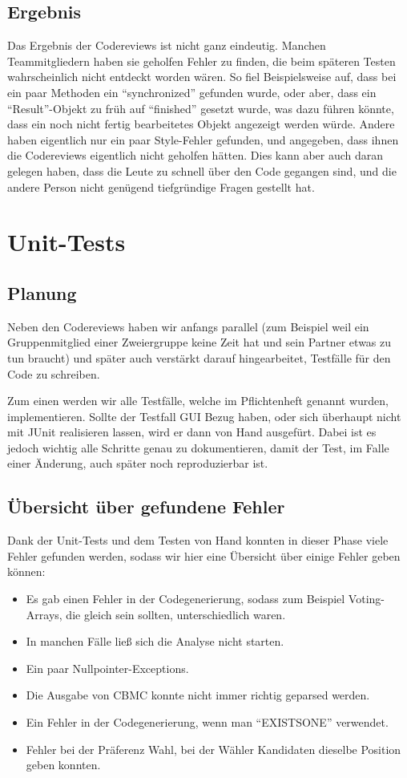\documentclass[a4paper]{scrreprt}
\begin{document}
\section{Ergebnis}
Das Ergebnis der Codereviews ist nicht ganz eindeutig. Manchen
Teammitgliedern haben sie geholfen Fehler zu finden, die beim späteren Testen
wahrscheinlich nicht entdeckt worden wären. So fiel Beispielsweise auf, dass
bei ein paar Methoden ein "`synchronized"' gefunden wurde, oder aber, dass ein
"`Result"'-Objekt zu früh auf "`finished"' gesetzt wurde, was dazu führen
könnte, dass ein noch nicht fertig bearbeitetes Objekt angezeigt werden würde.
Andere haben eigentlich nur ein paar Style-Fehler gefunden, und angegeben, dass
ihnen die Codereviews eigentlich nicht geholfen hätten. Dies kann aber auch
daran gelegen haben, dass die Leute zu schnell über den Code gegangen sind, und
die andere Person nicht genügend tiefgründige Fragen gestellt hat.

\chapter{Unit-Tests}

\section{Planung}
Neben den Codereviews haben wir anfangs parallel (zum
Beispiel weil ein Gruppenmitglied einer Zweiergruppe keine Zeit hat und sein
Partner etwas zu tun braucht) und später auch
verstärkt darauf hingearbeitet, Testfälle für den Code zu schreiben.

Zum einen werden wir alle Testfälle, welche im Pflichtenheft genannt wurden,
implementieren. Sollte der Testfall GUI Bezug haben, oder sich überhaupt nicht mit JUnit
realisieren lassen, wird er dann von Hand ausgefürt. Dabei ist es jedoch wichtig alle Schritte genau zu
dokumentieren, damit der Test, im Falle einer Änderung, auch später noch
reproduzierbar ist.

\section{Übersicht über gefundene Fehler}
Dank der Unit-Tests und dem Testen von Hand konnten in dieser Phase viele
Fehler gefunden werden, sodass wir hier eine Übersicht über einige Fehler geben können:

\begin{itemize}
  \item Es gab einen Fehler in der Codegenerierung, sodass zum Beispiel Voting-Arrays, die gleich sein sollten, unterschiedlich waren.
  \item In manchen Fälle ließ sich die Analyse nicht starten.
  \item Ein paar Nullpointer-Exceptions.
  \item Die Ausgabe von CBMC konnte nicht immer richtig geparsed werden.
  \item Ein Fehler in der Codegenerierung, wenn man "`EXISTSONE"' verwendet.
  \item Fehler bei der Präferenz Wahl, bei der Wähler Kandidaten dieselbe
  Position geben konnten.
\end{itemize}
\end{document}
